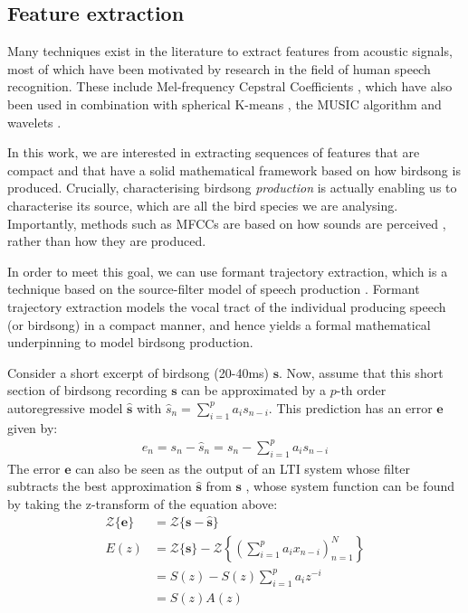 \documentclass[pdftex,11pt,a4paper]{article}
\theoremstyle{definition}
\theoremstyle{remark}
\newcommand*{\V}[1]{\mathbf{#1}}%
\begin{document}
\subsection{Feature extraction}
Many techniques exist in the literature to extract features from acoustic signals, most of which have been motivated by research in the field of human speech recognition. These include Mel-frequency Cepstral Coefficients \cite{Jurafsky2009, Chou2008a, Stowell2014, Gutierrez-Osuna2009}, which have also been used in combination with spherical K-means \cite{Stowell2014}, the MUSIC algorithm \cite{Evans, Kootsookos1999} and wavelets \cite{Gamulkiewicz2003, Chou2009}.
\par In this work, we are interested in extracting sequences of features that are compact and that have a solid mathematical framework based on how birdsong is produced. Crucially, characterising birdsong \emph{production} is actually enabling us to characterise its source, which are all the bird species we are analysing. Importantly, methods such as MFCCs are based on how sounds are perceived \cite{Muda2010}, rather than how they are produced. 
\par In order to meet this goal, we can use formant trajectory extraction, which is a technique based on the source-filter model of speech production \cite{Snell1993}. Formant trajectory extraction models the vocal tract of the individual producing speech (or birdsong) in a compact manner, and hence yields a formal mathematical underpinning to model birdsong production.
\par Consider a short excerpt of birdsong (20-40ms) $\V{s}$. Now, assume that this short section of birdsong recording $\V{s}$ can be approximated by a $p$-th order autoregressive model $\hat{\V{s}}$ with $\hat{s}_n = \sum_{i=1}^pa_is_{n-i}$. This prediction has an error $\V{e}$ given by:
\begin{align*}
e_n = s_n - \hat{s}_n = s_n - \sum_{i=1}^pa_is_{n-i}
\end{align*}
The error $\V{e}$ can also be seen as the output of an LTI system whose filter subtracts the best approximation $\hat{\V{s}}$ from $\V{s}$ \cite{Bello}, whose system function can be found by taking the z-transform of the equation above: 
\begin{align*}
\mathcal{Z}\{\V{e}\} &= \mathcal{Z}\{\V{s} - \hat{\V{s}}\}\\
E(z) &= \mathcal{Z}\{\V{s}\} - \mathcal{Z}\left\{ \left(\sum_{i=1}^pa_ix_{n-i}\right)_{n=1}^N\right\} \\
 &= S(z) - S(z)\sum_{i=1}^pa_iz^{-i}\\
 &= S(z)A(z)
\end{align*}
\end{document}

